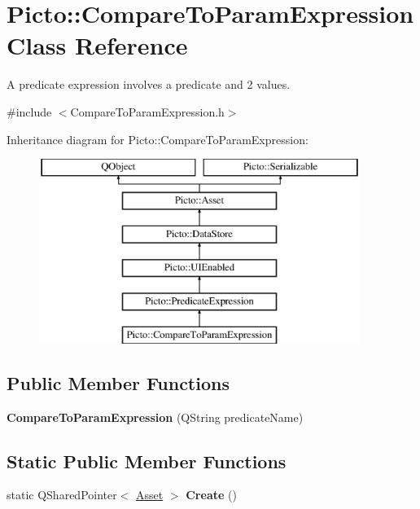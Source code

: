 \hypertarget{class_picto_1_1_compare_to_param_expression}{\section{Picto\-:\-:Compare\-To\-Param\-Expression Class Reference}
\label{class_picto_1_1_compare_to_param_expression}
}


A predicate expression involves a predicate and 2 values.  




{\ttfamily \#include $<$Compare\-To\-Param\-Expression.\-h$>$}

Inheritance diagram for Picto\-:\-:Compare\-To\-Param\-Expression\-:\begin{figure}[H]
\begin{center}
\leavevmode
\includegraphics[height=6.000000cm]{class_picto_1_1_compare_to_param_expression}
\end{center}
\end{figure}
\subsection*{Public Member Functions}
\begin{DoxyCompactItemize}
\item 
\hypertarget{class_picto_1_1_compare_to_param_expression_ae65f27ad0a62cf563734915a1dd885af}{{\bfseries Compare\-To\-Param\-Expression} (Q\-String predicate\-Name)}\label{class_picto_1_1_compare_to_param_expression_ae65f27ad0a62cf563734915a1dd885af}

\end{DoxyCompactItemize}
\subsection*{Static Public Member Functions}
\begin{DoxyCompactItemize}
\item 
\hypertarget{class_picto_1_1_compare_to_param_expression_a2b615e2af580cb5866d5f031cac0e8f9}{static Q\-Shared\-Pointer$<$ \hyperlink{class_picto_1_1_asset}{Asset} $>$ {\bfseries Create} ()}\label{class_picto_1_1_compare_to_param_expression_a2b615e2af580cb5866d5f031cac0e8f9}

\end{DoxyCompactItemize}
